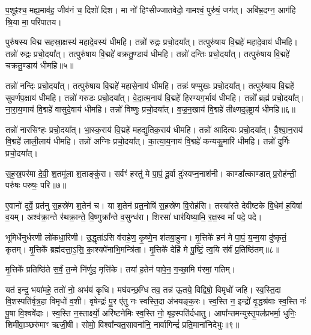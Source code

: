 प॒शूꣴश्च॒ मह्य॒माव॑ह॒ जीव॑नं च॒ दिशो॑ दिश। 
मा नो॑ हिꣳसीज्जातवेदो॒ गामश्वं॒ पुरु॑षं॒ जग॑त्। 
अबि॑भ्र॒दग्न॒ आग॑हि श्रि॒या मा॒ परि॑पातय।


 पुरु॑षस्य विद्म सहस्रा॒क्षस्य॑ महादे॒वस्य॑ धीमहि। 
 तन्नो॑ रुद्रः प्रचो॒दया᳚त्। 
 तत्पुरु॑षाय वि॒द्महे॑ महादे॒वाय॑ धीमहि। 
 तन्नो॑ रुद्रः प्रचो॒दया᳚त्। 
 तत्पुरु॑षाय वि॒द्महे॑ वक्रतु॒ण्डाय॑ धीमहि। 
 तन्नो॑ दन्तिः प्रचो॒दया᳚त्। 
 तत्पुरु॑षाय वि॒द्महे॑ चक्रतु॒ण्डाय॑ धीमहि॥५॥

 तन्नो॑ नन्दिः प्रचो॒दया᳚त्। 
 तत्पुरु॑षाय वि॒द्महे॑ महासे॒नाय॑ धीमहि। 
 तन्नः॑ षण्मुखः प्रचो॒दया᳚त्। 
 तत्पुरु॑षाय वि॒द्महे॑ सुवर्णप॒क्षाय॑ धीमहि। 
 तन्नो॑ गरुडः प्रचो॒दया᳚त्। 
 वे॒दा॒त्म॒नाय॑ वि॒द्महे॑ हिरण्यग॒र्भाय॑ धीमहि। 
 तन्नो᳚ ब्रह्म॑ प्रचो॒दया᳚त्। 
 ना॒रा॒य॒णाय॑ वि॒द्महे॑ वासुदे॒वाय॑ धीमहि। 
 तन्नो॑ विष्णुः प्रचो॒दया᳚त्। 
 व॒ज्र॒न॒खाय॑ वि॒द्महे॑ तीक्ष्णद॒ꣴ॒ष्ट्राय॑ धीमहि॥६॥
 
तन्नो॑ नारसिꣳहः प्रचो॒दया᳚त्। 
भा॒स्क॒राय॑ वि॒द्महे॑ महद्युतिक॒राय॑ धीमहि। 
तन्नो॑ आदित्यः प्रचो॒दया᳚त्। 
वै॒श्वा॒न॒राय॑ वि॒द्महे॑ लाली॒लाय॑ धीमहि। 
तन्नो॑ अग्निः प्रचो॒दया᳚त्। 
का॒त्या॒य॒नाय॑ वि॒द्महे॑ कन्यकु॒मारि॑ धीमहि। 
तन्नो॑ दुर्गिः प्रचो॒दया᳚त्। 


स॒ह॒स्र॒पर॑मा दे॒वी॒ श॒तमू॑ला श॒ताङ्कु॑रा। 
सर्वꣳ॑ हरतु॑ मे पा॒पं॒ दू॒र्वा दुः॑स्वप्न॒नाश॑नी। 
काण्डा᳚त्काण्डात् प्र॒रोह॑न्ती॒ परु॑षः परुषः॒ परि॑॥७॥

ए॒वानो॑ दूर्वे॒ प्रत॑नु स॒हस्रे॑ण श॒तेन॑ च। 
या श॒तेन॑ प्रत॒नोषि॑ स॒हस्रे॑ण वि॒रोह॑सि। 
तस्या᳚स्ते देवीष्टके वि॒धेम॑ ह॒विषा॑ व॒यम्। 
अश्व॑क्रा॒न्ते र॑थक्रा॒न्ते॒ वि॒ष्णुक्रा᳚न्ते व॒सुन्ध॑रा। 
शिरसा॑ धार॑यिष्या॒मि॒ र॒क्ष॒स्व मां᳚ पदे॒ पदे।

 भूमिर्धेनुर्धरणी लो॑कधा॒रिणी। 
 उ॒द्धृता॑ऽसि व॑राहे॒ण॒ कृ॒ष्णे॒न श॑तबा॒हुना। 
 मृ॒त्तिके॑ हन॑ मे पा॒पं॒ य॒न्म॒या दु॑ष्कृतं॒ कृतम्। 
 मृ॒त्तिके᳚ ब्रह्म॑दत्ता॒ऽ॒सि॒ का॒श्यपे॑नाभि॒मन्त्रि॑ता। 
 मृ॒त्तिके॑ देहि॑ मे पु॒ष्टिं॒ त्व॒यि स॑र्वं प्र॒तिष्ठि॑तम्॥८॥
 
 मृ॒त्तिके᳚ प्रतिष्ठि॑ते स॒र्वं॒ त॒न्मे नि॑र्णुद॒ मृत्ति॑के। 
 तया॑ ह॒तेन॑ पापे॒न॒ ग॒च्छा॒मि प॑रमां॒ गतिम्।

यत॑ इन्द्र॒ भया॑महे॒ ततो॑ नो॒ अभ॑यं कृधि। 
मघ॑वन्छ॒ग्धि तव॒ तन्न॑ ऊ॒तये॒ विद्विषो॒ विमृधो॑ जहि। 
स्व॒स्ति॒दा वि॒शस्पति॑र्वृत्र॒हा विमृधो॑ व॒शी। 
वृषेन्द्रः॑ पु॒र ए॑तु नः स्वस्ति॒दा अ॑भयङ्क॒रः। 
स्व॒स्ति न॒ इन्द्रो॑ वृ॒द्धश्र॑वाः स्व॒स्ति नः॑ पू॒षा वि॒श्ववे॑दाः। 
स्व॒स्ति न॒स्तार्क्ष्यो॒ अरि॑ष्टनेमिः स्व॒स्ति नो॒ बृह॒स्पति॑र्दधातु। 
आपा᳚न्तमन्युस्तृ॒पल॑प्रभर्मा॒ धुनिः॒ शिमी॑वा॒ञ्छरु॑माꣳ ऋजी॒षी। 
सोमो॒ विश्वा᳚न्यत॒सावना॑नि॒ नार्वागिन्द्रं॑ प्रति॒माना॑निदेभुः॥९॥

